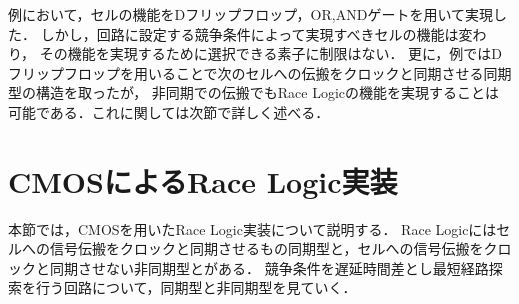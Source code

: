 例において，セルの機能をDフリップフロップ，OR,ANDゲートを用いて実現した．
しかし，回路に設定する競争条件によって実現すべきセルの機能は変わり，
その機能を実現するために選択できる素子に制限はない．
更に，例ではDフリップフロップを用いることで次のセルへの伝搬をクロックと同期させる同期型の構造を取ったが，
非同期での伝搬でもRace Logicの機能を実現することは可能である．これに関しては次節で詳しく述べる．

\section{CMOSによるRace Logic実装}
本節では，CMOSを用いたRace Logic実装について説明する．
Race Logicにはセルへの信号伝搬をクロックと同期させるもの同期型と，セルへの信号伝搬をクロックと同期させない非同期型とがある．
競争条件を遅延時間差とし最短経路探索を行う回路について，同期型と非同期型を見ていく．

